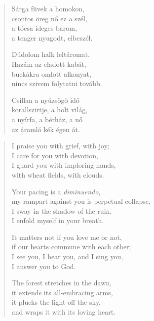 \documentclass[11pt]{extbook}
\newcommand*{\centeredornament}{\centerline{\pgfornament[width=6cm]{88}}}
\begin{document}
\newpage

\vspace*{-15mm}
\centeredornament



\begin{verse}
  Sárga füvek a homokon, \\
  csontos öreg nő ez a szél, \\
  a tócsa ideges barom, \\
  a tenger nyugodt, elbeszél.

  Dúdolom halk leltáromat. \\
  Hazám az eladott kabát, \\
  buckákra omlott alkonyat, \\
  nincs szivem folytatni tovább.

  Csillan a nyüzsögő idő \\
  korallszirtje, a holt világ, \\
  a nyírfa, a bérház, a nő \\
  az áramló kék égen át.
\end{verse}

\newpage


\vspace*{-15mm}
\centeredornament



\begin{verse}
  I praise you with grief, with joy; \\
  I care for you with devotion, \\
  I guard you with imploring hands, \\
  with wheat fields, with clouds.

  Your pacing is a \emph{diminuendo}, \\
  my rampart against you is perpetual collapse, \\
  I sway in the shadow of the ruin, \\
  I enfold myself in your breath.

  It matters not if you love me or not, \\
  if our hearts commune with each other;\\
  I see you, I hear you, and I sing you, \\
  I answer you to God.

  The forest stretches in the dawn, \\
  it extends its all-embracing arms, \\
  it plucks the light off the sky, \\
  and wraps it with its loving heart.
\end{verse}
\end{document}
